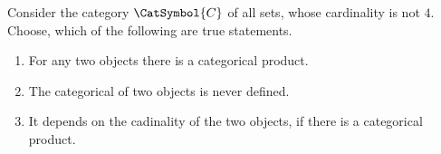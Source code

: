 \begin{quiz}
Consider the category $\CatSymbol{C}$ of all sets, whose cardinality is not $4$. Choose, which of the following are true statements.
\begin{enumerate}[label=(\alph*)]
\item For any two objects there is a categorical product.
\item The categorical of two objects is never defined.
\item It depends on the cadinality of the two objects, if there is a categorical product.
\end{enumerate}
\end{quiz}
